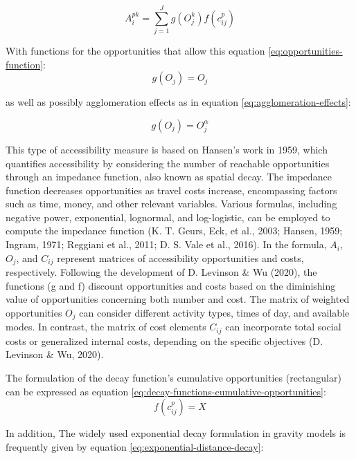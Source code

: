 \documentclass[
11pt, %
oneside, %
english, %
singlespacing, %
]{macthesis} %
\begin{document}
\begin{equation}
A^{pk}_i = \sum _{j=1} ^ {J} g(O^ k_{j}) f(c^p_{ij})
\label{eq:accessibility}
\end{equation}

With functions for the opportunities that allow this equation \ref{eq:opportunities-function}:
\begin{equation}
g(O_j) = O_j
\label{eq:opportunities-function}
\end{equation}

\noindent as well as possibly agglomeration effects as in equation \ref{eq:agglomeration-effects}:

\begin{equation}
g(O_j) = O^\alpha_j
\label{eq:agglomeration-effects}
\end{equation}

This type of accessibility measure is based on Hansen's work in 1959, which quantifies accessibility by considering the number of reachable opportunities through an impedance function, also known as spatial decay. The impedance function decreases opportunities as travel costs increase, encompassing factors such as time, money, and other relevant variables. Various formulas, including negative power, exponential, lognormal, and log-logistic, can be employed to compute the impedance function (K. T. Geurs, Eck, et al., 2003; Hansen, 1959; Ingram, 1971; Reggiani et al., 2011; D. S. Vale et al., 2016). In the formula, \(A_i\), \(O_j\), and \(C_{ij}\) represent matrices of accessibility opportunities and costs, respectively. Following the development of D. Levinson \& Wu (2020), the functions (g and f) discount opportunities and costs based on the diminishing value of opportunities concerning both number and cost. The matrix of weighted opportunities \(O_j\) can consider different activity types, times of day, and available modes. In contrast, the matrix of cost elements \(C_{ij}\) can incorporate total social costs or generalized internal costs, depending on the specific objectives (D. Levinson \& Wu, 2020).

The formulation of the decay function's cumulative opportunities (rectangular) can be expressed as equation \ref{eq:decay-functions-cumulative-opportunities}:
\begin{equation}
f(c^p_{ij}) = X
\label{eq:decay-functions-cumulative-opportunities}
\end{equation}

In addition, The widely used exponential decay formulation in gravity models is frequently given by equation \ref{eq:exponential-distance-decay}:
\end{document}
